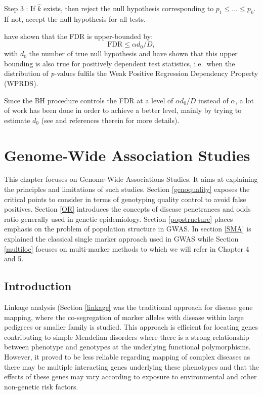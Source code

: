 \documentclass[]{book}
\begin{document}
Step 3 : If \(\hat{k}\) exists, then reject the null hypothesis corresponding
to \(p_1 \leq \dots \leq p_k\). If not, accept the null hypothesis for
all tests.

\citep{benjamini_controlling_1995} have shown that the FDR is upper-bounded
by: \[\text{FDR} \leq \alpha d_0/D,\] with \(d_0\) the number of true null
hypothesis and have shown that this upper bounding is also true for
positively dependent test statistics, i.e.~when the distribution of
\emph{p}-values fulfils the Weak Positive Regression Dependency Property
(WPRDS).

Since the BH procedure controls the FDR at a level of \(\alpha d_0/D\)
instead of \(\alpha\), a lot of work has been done in order to achieve a
better level, mainly by trying to estimate \(d_0\) (see \citep{roquain2010type}
and references therein for more details).

\hypertarget{genome-wide-association-studies}{%
\chapter{Genome-Wide Association Studies}\label{genome-wide-association-studies}}

This chapter focuses on Genome-Wide Associations Studies. It aims at explaining the principles and limitations of such studies. Section \ref{genoquality} exposes the critical points to consider in terms of genotyping quality control to avoid false positives. Section \ref{OR} introduces the concepts of disease penetrances and odds ratio generally used in genetic epidemiology. Section \ref{popstructure} places emphasis on the problem of population structure in GWAS. In section \ref{SMA} is explained the classical single marker approach used in GWAS while Section \ref{multiloc} focuses on multi-marker methods to which we will refer in Chapter 4 and 5.

\hypertarget{introduction-2}{%
\section{Introduction}\label{introduction-2}}

Linkage analysis (Section \ref{linkage} was the traditional approach
for disease gene mapping, where the co-segregation of marker alleles
with disease within large pedigrees or smaller family is studied. This
approach is efficient for locating genes contributing to simple
Mendelian disorders where there is a strong relationship between
phenotype and genotypes at the underlying functional polymorphisms.
However, it proved to be less reliable regarding mapping of complex
diseases as there may be multiple interacting genes underlying these
phenotypes and that the effects of these genes may vary according to
exposure to environmental and other non-genetic risk factors.
\end{document}
